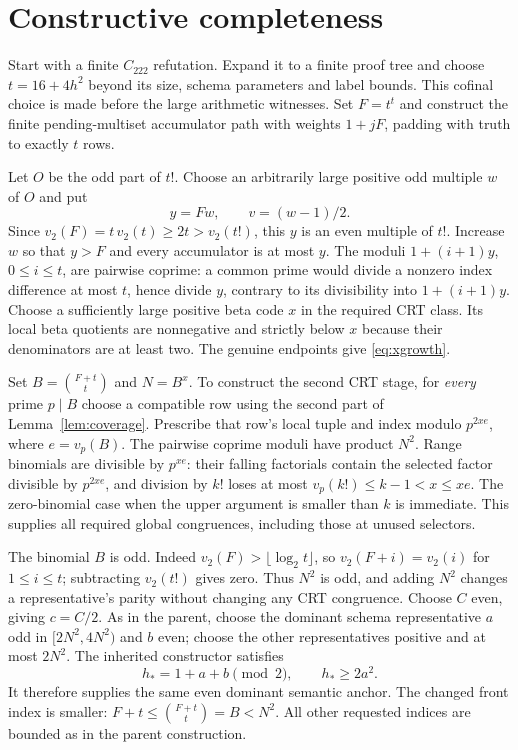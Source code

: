 \section{Constructive completeness}\label{sec:complete}

Start with a finite $C_{222}$ refutation. Expand it to a finite proof tree
and choose $t=16+4h^2$ beyond its size, schema parameters and label bounds.
This cofinal choice is made before the large arithmetic witnesses. Set
$F=t^t$ and construct the finite pending-multiset accumulator path with
weights $1+jF$, padding with truth to exactly $t$ rows.

Let $O$ be the odd part of $t!$. Choose an arbitrarily large positive odd
multiple $w$ of $O$ and put
\[
 y=Fw,\qquad v=(w-1)/2.
\]
Since $v_2(F)=t\,v_2(t)\ge2t>v_2(t!)$, this $y$ is an even multiple
of $t!$. Increase $w$ so that $y>F$ and every accumulator is at most $y$.
The moduli $1+(i+1)y$, $0\le i\le t$, are pairwise coprime: a common
prime would divide a nonzero index difference at most $t$, hence divide
$y$, contrary to its divisibility into $1+(i+1)y$. Choose a sufficiently
large positive beta code $x$ in the required CRT class. Its local beta
quotients are nonnegative and strictly below $x$ because their denominators
are at least two. The genuine endpoints give \eqref{eq:xgrowth}.

Set $B=\binom{F+t}{t}$ and $N=B^x$. To construct the second CRT stage,
for \emph{every} prime $p\mid B$ choose a compatible row using the second
part of Lemma~\ref{lem:coverage}. Prescribe that row's local tuple and
index modulo $p^{2xe}$, where $e=v_p(B)$. The pairwise coprime moduli have
product $N^2$. Range binomials are divisible by $p^{xe}$: their falling
factorials contain the selected factor divisible by $p^{2xe}$, and division
by $k!$ loses at most $v_p(k!)\le k-1<x\le xe$. The zero-binomial case
when the upper argument is smaller than $k$ is immediate. This supplies
all required global congruences, including those at unused selectors.

The binomial $B$ is odd. Indeed $v_2(F)>\lfloor\log_2t\rfloor$, so
$v_2(F+i)=v_2(i)$ for $1\le i\le t$; subtracting $v_2(t!)$ gives zero.
Thus $N^2$ is odd, and adding $N^2$ changes a representative's parity
without changing any CRT congruence. Choose $C$ even, giving $c=C/2$.
As in the parent, choose the dominant schema representative $a$ odd in
$[2N^2,4N^2)$ and $b$ even; choose the other representatives positive and
at most $2N^2$. The inherited constructor satisfies
\[
 h_*=1+a+b\pmod2,\qquad h_*\ge2a^2.
\]
It therefore supplies the same even dominant semantic anchor.
The changed front index is smaller: $F+t\le\binom{F+t}{t}=B<N^2$.
All other requested indices are bounded as in the parent construction.

